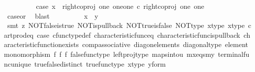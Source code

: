 \begin{isabellebody}
\ \ \ \ \ \ \isamarkupfalse%
\ \isamarkupfalse%
\ case{}{\isacharcolon}{\kern0pt}\ {\isachardoublequoteopen}x\ {\isacharequal}{\kern0pt}\ right{\isacharunderscore}{\kern0pt}coproj\ one\ {\isacharparenleft}{\kern0pt}one{\isasymCoprod}one{\isacharparenright}{\kern0pt}\ {\isasymcirc}\isactrlsub c\ right{\isacharunderscore}{\kern0pt}coproj\ one\ one{\isachardoublequoteclose}\isanewline
\ \ \ \ \ \ \ \ \isamarkupfalse%
\ case{}{\isacharunderscore}{\kern0pt}or{\isacharunderscore}{\kern0pt}{}\ \isamarkupfalse%
\ blast\isanewline
\ \ \ \ \ \ \isamarkupfalse%
\ \isamarkupfalse%
\ {\isachardoublequoteopen}x\ {\isacharequal}{\kern0pt}\ y{\isachardoublequoteclose}\isanewline
\ \ \ \ \ \ \ \ \isamarkupfalse%
\ {\isacharparenleft}{\kern0pt}smt\ {\isacharparenleft}{\kern0pt}z{}{\isacharparenright}{\kern0pt}\ NOT{\isacharunderscore}{\kern0pt}false{\isacharunderscore}{\kern0pt}is{\isacharunderscore}{\kern0pt}true\ NOT{\isacharunderscore}{\kern0pt}is{\isacharunderscore}{\kern0pt}pullback\ NOT{\isacharunderscore}{\kern0pt}true{\isacharunderscore}{\kern0pt}is{\isacharunderscore}{\kern0pt}false\ NOT{\isacharunderscore}{\kern0pt}type\ x{\isacharunderscore}{\kern0pt}type\ x{\isacharunderscore}{\kern0pt}type{\isacharprime}{\kern0pt}\ cart{\isacharunderscore}{\kern0pt}prod{\isacharunderscore}{\kern0pt}eq{}\ case{}\ cfunc{\isacharunderscore}{\kern0pt}type{\isacharunderscore}{\kern0pt}def\ characteristic{\isacharunderscore}{\kern0pt}func{\isacharunderscore}{\kern0pt}eq\ characteristic{\isacharunderscore}{\kern0pt}func{\isacharunderscore}{\kern0pt}is{\isacharunderscore}{\kern0pt}pullback\ characteristic{\isacharunderscore}{\kern0pt}function{\isacharunderscore}{\kern0pt}exists\ comp{\isacharunderscore}{\kern0pt}associative\ diag{\isacharunderscore}{\kern0pt}on{\isacharunderscore}{\kern0pt}elements\ diagonal{\isacharunderscore}{\kern0pt}type\ element{\isacharunderscore}{\kern0pt}monomorphism\ f{}\ f{}\ f{}\ false{\isacharunderscore}{\kern0pt}func{\isacharunderscore}{\kern0pt}type\ left{\isacharunderscore}{\kern0pt}proj{\isacharunderscore}{\kern0pt}type\ maps{\isacharunderscore}{\kern0pt}into{\isacharunderscore}{\kern0pt}{}u{}\ mx{\isacharunderscore}{\kern0pt}eqs{\isacharunderscore}{\kern0pt}my\ terminal{\isacharunderscore}{\kern0pt}func{\isacharunderscore}{\kern0pt}unique\ true{\isacharunderscore}{\kern0pt}false{\isacharunderscore}{\kern0pt}distinct\ true{\isacharunderscore}{\kern0pt}func{\isacharunderscore}{\kern0pt}type\ x{\isacharunderscore}{\kern0pt}type\ y{\isacharunderscore}{\kern0pt}form{\isacharparenright}{\kern0pt}\isanewline

\end{isabellebody}
